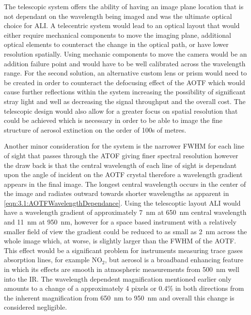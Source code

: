\documentclass[12pt]{article}
\begin{document}
The telescopic system offers the ability of having an image plane location that is not dependant on the wavelength being imaged and was the ultimate optical choice for ALI. A telecentric system would lead to an optical layout that would either require mechanical components to move the imaging plane, additional optical elements to counteract the change in the optical path, or have lower resolution spatially. Using mechanic components to move the camera would be an addition failure point and would have to be well calibrated across the wavelength range. For the second solution, an alternative custom lens or prism would need to be created in order to counteract the defocusing effect of the AOTF which would cause further reflections within the system increasing the possibility of significant stray light and well as decreasing the signal throughput and the overall cost. The telescopic design would also allow for a greater focus on spatial resolution that could be achieved which is necessary in order to be able to image the fine structure of aerosol extinction on the order of 100s of metres.

Another minor consideration for the system is the narrower FWHM for each line of sight that passes through the ATOF giving finer spectral resolution however the draw back is that the central wavelength of each line of sight is dependant upon the angle of incident on the AOTF crystal therefore a wavelength gradient appears in the final image. The longest central wavelength occurs in the center of the image and radiates outward towards shorter wavelengths as apparent in \autoref{eqn:3.1:AOTFWavelengthDependance}. Using the telescoptic layout ALI would have a wavelength gradient of approximately 7~nm at 650~nm central wavelength and 11~nm at 950~nm, however for a space based instrument with a relatively smaller field of view the gradient could be reduced to as small as 2~nm across the whole image which, at worse, is slightly larger than the FWHM of the AOTF. This effect would be a significant problem for instruments measuring trace gases absorption lines, for example NO$_{2}$, but aerosol is a broadband enhancing feature in which its effects are smooth in atmospheric measurements from 500~nm well into the IR. The wavelength dependent magnification mentioned earlier only amounts to a change of a approximately 4 pixels or 0.4\% in both directions from the inherent magnification from 650~nm to 950~nm and overall this change is considered negligible.
\end{document}
